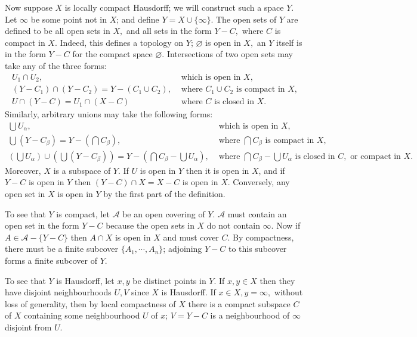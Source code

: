 Now suppose $X$ is locally compact Hausdorff; we will construct such a space $Y.$ Let $\infty$ be some point not in $X$; and define $Y = X \cup \{\infty\}$. The open sets of $Y$ are defined to be all open sets in $X,$ and all sets in the form $Y-C,$ where $C$ is compact in $X.$ Indeed, this defines a topology on $Y$; $\varnothing$ is open in $X,$ an $Y$ itself is in the form $Y-C$ for the compact space $\varnothing$. Intersections of two open sets may take any of the three forms:
\begin{align*}
    U_1 \cap U_2, &\text{ which is open in } X, \\
    (Y-C_1) \cap (Y-C_2) = Y-(C_1\cup C_2), &\text{ where } C_1\cup C_2 \text{ is compact in } X, \\
    U \cap (Y - C) = U_1 \cap (X-C) &\text{ where } C \text{ is closed in } X.
\end{align*}
Similarly, arbitrary unions may take the following forms:
\begin{align*}
    \bigcup U_\alpha, &\text{ which is open in } X, \\
    \bigcup (Y-C_\beta) = Y- (\bigcap C_\beta), &\text{ where } \bigcap C_\beta \text{ is compact in } X, \\
    (\bigcup U_\alpha) \cup (\bigcup (Y-C_\beta)) = Y - (\bigcap C_\beta - \bigcup U_\alpha), &\text{ where } \bigcap C_\beta - \bigcup U_\alpha \text{ is closed in } C, \text{ or compact in } X.
\end{align*}
Moreover, $X$ is a subspace of $Y.$ If $U$ is open in $Y$ then it is open in $X$, and if $Y - C$ is open in $Y$ then $(Y-C) \cap X = X-C$ is open in $X.$ Conversely, any open set in $X$ is open in $Y$ by the first part of the definition.

To see that $Y$ is compact, let $\mathcal{A}$ be an open covering of $Y.$ $\mathcal{A}$ must contain an open set in the form $Y-C$ because the open sets in $X$ do not contain $\infty.$ Now if $A \in \mathcal{A} - \{Y-C\}$ then $A \cap X$ is open in $X$ and must cover $C.$ By compactness, there must be a finite subcover $\{A_1, \cdots, A_n\}$; adjoining $Y-C$ to this subcover forms a finite subcover of $Y.$

To see that $Y$ is Hausdorff, let $x, y$ be distinct points in $Y.$ If $x, y \in X$ then they have disjoint neighbourhoods $U, V$ since $X$ is Hausdorff. If $x \in X, y = \infty,$ without loss of generality, then by local compactness of $X$ there is a compact subspace $C$ of $X$ containing some neighbourhood $U$ of $x$; $V = Y-C$ is a neighbourhood of $\infty$ disjoint from $U$.

